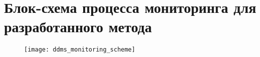 \chapter{Блок-схема процесса мониторинга для разработанного метода}
\label{app:DDMS:MonitoringScheme}
\begin{figure}[H]
\texttt{[image: ddms\_monitoring\_scheme]}
\end{figure}